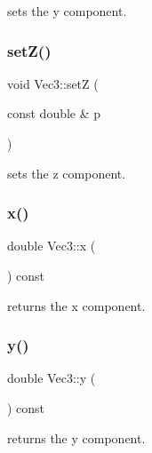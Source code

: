 sets the y component. 

\mbox{\label{classVec3_a82a4d4efb9e16963297de236abf2fa45}} 
\subsubsection{\texorpdfstring{set\+Z()}{setZ()}}
{\footnotesize\ttfamily void Vec3\+::setZ (\begin{DoxyParamCaption}\item[{const double \&}]{p }\end{DoxyParamCaption})\hspace{0.3cm}{\ttfamily [inline]}}



sets the z component. 

\mbox{\label{classVec3_aa0c360c4d0f99d61709283abbd6deaf9}} 
\subsubsection{\texorpdfstring{x()}{x()}}
{\footnotesize\ttfamily double Vec3\+::x (\begin{DoxyParamCaption}{ }\end{DoxyParamCaption}) const\hspace{0.3cm}{\ttfamily [inline]}}



returns the x component. 

\mbox{\label{classVec3_a83d4776aef2cb68f2382e2f7f60fb03d}} 
\subsubsection{\texorpdfstring{y()}{y()}}
{\footnotesize\ttfamily double Vec3\+::y (\begin{DoxyParamCaption}{ }\end{DoxyParamCaption}) const\hspace{0.3cm}{\ttfamily [inline]}}



returns the y component. 

\mbox{\label{classVec3_a6e36d3b30e7d9727a57785d3c2b88471}} 
